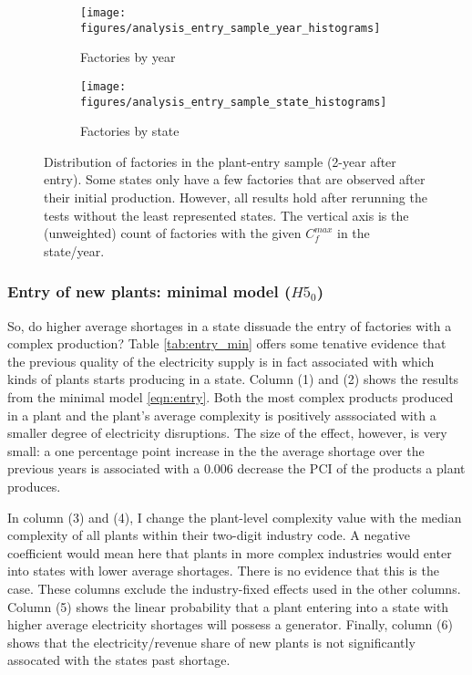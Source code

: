 \documentclass[11pt]{article}
\begin{document}
\begin{figure}
     \centering
     \begin{subfigure}[b]{0.45\textwidth}
         \centering
         \texttt{[image: figures/analysis\_entry\_sample\_year\_histograms]}
	 \caption{Factories by year}
         \label{fig:entry_by_year}
     \end{subfigure}
     \hfill
     \begin{subfigure}[b]{0.45\textwidth}
         \centering
         \texttt{[image: figures/analysis\_entry\_sample\_state\_histograms]}
	 \caption{Factories by state}
         \label{fig:entry_by_state}
     \end{subfigure}
     \caption{Distribution of factories in the plant-entry sample (2-year after entry). Some states only have a few factories that are observed after their initial production. However, all results hold after rerunning the tests without the least represented states. The vertical axis is the (unweighted) count of factories with the given $C^{max}_{f}$ in the state/year.}
        \label{fig:new_entry_sample}
\end{figure}

\subsubsection{Entry of new plants: minimal model ($H5_0$)}

So, do higher average shortages in a state dissuade the entry of factories with a complex production? Table \ref{tab:entry_min} offers some tenative evidence that the previous quality of the electricity supply is in fact associated with which kinds of plants starts producing in a state. Column (1) and (2) shows the results from the minimal model \ref{eqn:entry}. Both the most complex products produced in a plant and the plant's average complexity is positively asssociated with a smaller degree of electricity disruptions. The size of the effect, however, is very small: a one percentage point increase in the the average shortage over the previous years is associated with a 0.006 decrease the PCI of the products a plant produces.

In column (3) and (4), I change the plant-level complexity value with the median complexity of all plants within their two-digit industry code. A negative coefficient would mean here that plants in more complex industries would enter into states with lower average shortages. There is no evidence that this is the case. These columns exclude the industry-fixed effects used in the other columns. Column (5) shows the linear probability that a plant entering into a state with higher average electricity shortages will possess a generator. Finally, column (6) shows that the electricity/revenue share of new plants is not significantly assocated with the states past shortage.
\end{document}
